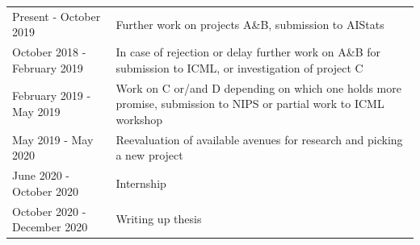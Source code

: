 \documentclass[12pt]{article}
\begin{document}
\begin{table}[h!]
\begin{tabular}{lp{11cm}}
Present - October 2019         & Further work on projects A\&B, submission to AIStats \\
October 2018 - February 2019   & In case of rejection or delay further work on A\&B for submission to ICML, or investigation of project C \\
February 2019 - May 2019       & Work on C or/and D depending on which one holds more promise, submission to NIPS or partial work to ICML workshop \\
May 2019 - May 2020            & Reevaluation of available avenues for research and picking a new project \\
June 2020 - October 2020       & Internship \\
October 2020 - December 2020   & Writing up thesis
\end{tabular}
\end{table}





\newpage 

 
\end{document}
